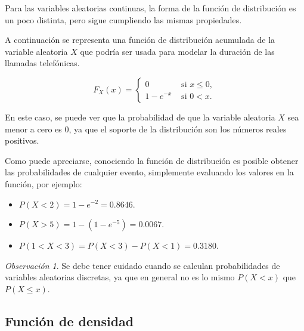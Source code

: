 \documentclass[
  us-letterpaper,
]{scrreprt}
\theoremstyle{plain}
\theoremstyle{definition}
\theoremstyle{definition}
\theoremstyle{plain}
\theoremstyle{remark}
\newtheorem*{remark}{Observación}
\begin{document}
\begin{tcolorbox}[enhanced jigsaw, breakable, colbacktitle=quarto-callout-caution-color!10!white, rightrule=.15mm, toptitle=1mm, colback=white, left=2mm, colframe=quarto-callout-caution-color-frame, bottomtitle=1mm, opacitybacktitle=0.6, leftrule=.75mm, arc=.35mm, title={Ejemplo (\textbf{\emph{Duración de una llamada telefónica}})}, coltitle=black, titlerule=0mm, opacityback=0, bottomrule=.15mm, toprule=.15mm]

Para las variables aleatorias continuas, la forma de la función de
distribución es un poco distinta, pero sigue cumpliendo las mismas
propiedades.

A continuación se representa una función de distribución acumulada de la
variable aleatoria \(X\) que podría ser usada para modelar la duración
de las llamadas telefónicas.

\[ F_X(x)=\begin{cases}0 & \text{ si } x\leq 0,\\ 1-e^{-x} & \text{ si } 0< x.\end{cases} \]

En este caso, se puede ver que la probabilidad de que la variable
aleatoria \(X\) sea menor a cero es 0, ya que el soporte de la
distribución son los números reales positivos.

Como puede apreciarse, conociendo la función de distribución es posible
obtener las probabilidades de cualquier evento, simplemente evaluando
los valores en la función, por ejemplo:

\begin{itemize}
\item
  \(P(X<2)=1-e^{-2}=0.8646\).
\item
  \(P(X>5)=1-(1-e^{-5})=0.0067\).
\item
  \(P(1<X<3)=P(X<3)-P(X<1)=0.3180\).
\end{itemize}

\end{tcolorbox}

\begin{remark}
Se debe tener cuidado cuando se calculan probabilidades de variables
aleatorias discretas, ya que en general no es lo mismo \(P(X< x)\) que
\(P(X\leq x)\).
\end{remark}

\subsection{Función de densidad}\label{funciuxf3n-de-densidad}
\end{document}
